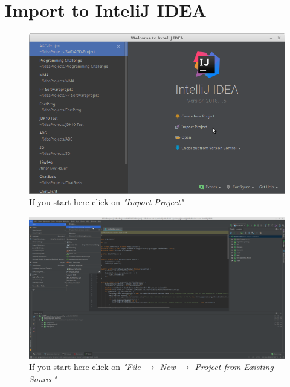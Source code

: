 \section{Import to InteliJ IDEA}
\label{sec:imp_idea}

\begin{figure}[H]
	\includegraphics[width=\textwidth]{setup-parts/pictures/idea-import-1a.png}
	\caption[width=\textwidth/2]{If you start here click on \textit{"Import Project"}}
\end{figure}
\begin{figure}[H]
	\includegraphics[width=\textwidth]{setup-parts/pictures/idea-import-1b.png}
	\caption[width=\textwidth/2]{If you start here click on \textit{"File $\rightarrow$ New $\rightarrow$ Project from Existing Source"}}
\end{figure}

